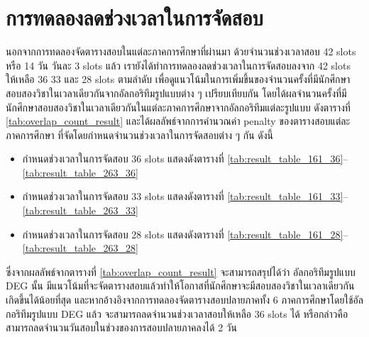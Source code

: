 \section{การทดลองลดช่วงเวลาในการจัดสอบ}
นอกจากการทดลองจัดตารางสอบในแต่ละภาคการศึกษาที่ผ่านมา ด้วยจำนวนช่วงเวลาสอบ 42 slots หรือ 14 วัน วันละ 3 slots แล้ว
เรายังได้ทำการทดลองลดช่วงเวลาในการจัดสอบลงจาก 42 slots ให้เหลือ 36 33 และ 28 slots ตามลำดับ
เพื่อดูแนวโน้มในการเพิ่มขึ้นของจำนวนครั้งที่มีนักศึกษาสอบสองวิชาในเวลาเดียวกันจากอัลกอริทึมรูปแบบต่าง ๆ เปรียบเทียบกัน
โดยได้ผลจำนวนครั้งที่มีนักศึกษาสอบสองวิชาในเวลาเดียวกันในแต่ละภาคการศึกษาจากอัลกอริทึมแต่ละรูปแบบ ดังตารางที่ \ref{tab:overlap_count_result}
และได้ผลลัพธ์จากการคำนวณค่า penalty ของตารางสอบแต่ละภาคการศึกษา ที่จัดโดยกำหนดจำนวนช่วงเวลาในการจัดสอบต่าง ๆ กัน ดังนี้
\begin{itemize}
    \item กำหนดช่วงเวลาในการจัดสอบ 36 slots แสดงดังตารางที่ \ref{tab:result_table_161_36}--\ref{tab:result_table_263_36}
    \item กำหนดช่วงเวลาในการจัดสอบ 33 slots แสดงดังตารางที่ \ref{tab:result_table_161_33}--\ref{tab:result_table_263_33}
    \item กำหนดช่วงเวลาในการจัดสอบ 28 slots แสดงดังตารางที่ \ref{tab:result_table_161_28}--\ref{tab:result_table_263_28}
\end{itemize}
ซึ่งจากผลลัพธ์จากตารางที่ \ref{tab:overlap_count_result} จะสามารถสรุปได้ว่า อัลกอริทึมรูปแบบ DEG นั้น 
มีแนวโน้มที่จะจัดตารางสอบแล้วทำให้โอกาสที่นักศึกษาจะมีสอบสองวิชาในเวลาเดียวกันเกิดขึ้นได้น้อยที่สุด 
และหากอ้างอิงจากการทดลองจัดตารางสอบปลายภาคทั้ง 6 ภาคการศึกษาโดยใช้อัลกอริทึมรูปแบบ DEG แล้ว 
จะสามารถลดจำนวนช่วงเวลาสอบให้เหลือ 36 slots ได้ หรือกล่าวคือสามารถลดจำนวนวันสอบในช่วงของการสอบปลายภาคลงได้ 2 วัน
